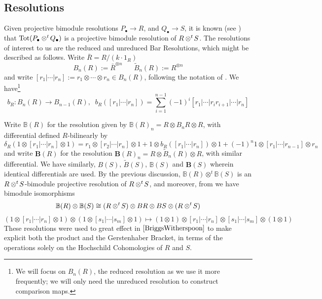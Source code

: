 \documentclass{article}
\newcommand{\ten}{\otimes}
\newcommand{\twisten}{\otimes^t\hspace{-1pt}}
\theoremstyle{plain}
\theoremstyle{definition}
\begin{document}
\subsection{Resolutions}
Given projective bimodule resolutions $P_\bullet \rightarrow R$, and $Q_\bullet \rightarrow S$, it is known (see \cite{Witherspoon}) that $\operatorname{Tot}(P_\bullet \twisten Q_\bullet)$ is a projective bimodule resolution of $R \twisten S$. The resolutions of interest to us are the reduced and unreduced Bar Resolutions, which might be described as follows. Write $\bar{R} = R / (k \cdot 1_R)$ 
$$B_n(R) := \bar{R}^{\otimes n} \hspace{20pt} \tilde{B}_n(R) := R^{\otimes n}$$
and write $[r_1|\cdots |r_n] := r_1 \ten \cdots \ten r_n \in B_n(R)$, following the notation of \cite{BriggsWitherspoon}. We have\footnote{ We will focus on $B_n(R)$, the reduced resolution as we use it more frequently; we will only need the unreduced resolution to construct comparison maps.}
$$b_R:B_n (R) \rightarrow B_{n-1}(R), \; \; b_R([r_1|\cdots|r_n]) = \sum_{i=1}^{n-1} (-1)^i[r_1| \cdots |r_i r_{i+1}| \cdots | r_n]$$

Write $\mathbb{B}(R)$ for the resolution given by $\mathbb{B}(R)_n = R \otimes B_n R \otimes R$, with differential defined $R$-bilinearly by
$$\delta_R(1 \otimes [r_1 |\cdots | r_n] \otimes 1) = r_1 \otimes [r_2 | \cdots |r_n] \otimes 1 +  1 \ten b_R([r_1|\cdots | r_n])\ten 1 +(-1)^n 1 \ten [r_1 | \cdots |r_{n-1}] \ten r_n$$
and write $\mathbf{B}(R)$ for the resolution $\mathbf{B}(R)_n = R \otimes \tilde{B}_n(R) \otimes R$, with similar differential. We have similarly, $B(S)$, $\tilde{B}(S)$, $\mathbb{B}(S)$ and $\mathbf{B}(S)$ wherein identical differentials are used. By the previous discussion, $\mathbb{B}(R) \otimes^t \mathbb{B}(S)$ is an $R \twisten S$-bimodule projective resolution of $R \twisten S$, and moreover, from \cite{BriggsWitherspoon} we have bimodule isomorphisms
$$\mathbb{B}(R) \otimes \mathbb{B}(S) \cong (R \twisten S) \otimes BR \otimes BS \otimes (R \twisten S)$$
$$(1 \otimes [r_1 | \cdots | r_n] \ten 1) \ten (1 \ten [s_1 |\cdots |s_m] \ten 1) \mapsto (1 \ten 1) \otimes [r_1 | \cdots | r_n] \ten [s_1 |\cdots |s_m] \ten (1 \otimes 1)$$
These resolutions were used to great effect in $\cite{BriggsWitherspoon}$ to make explicit both the product and the Gerstenhaber Bracket, in terms of the operations solely on the Hochschild Cohomologies of $R$ and $S$.
\end{document}
